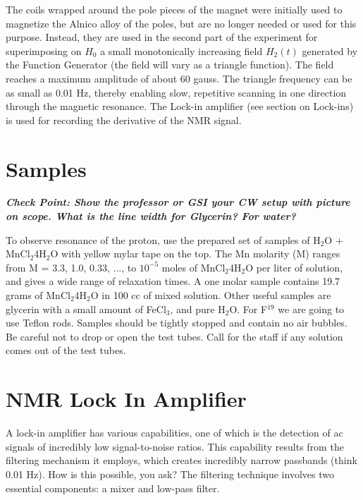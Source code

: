 \documentclass{../lab}
\begin{document}
The coils wrapped around the pole pieces of the magnet were initially used to magnetize the Alnico alloy of the poles, but are no longer needed or used for this purpose. Instead, they are used in the second part of the experiment for superimposing on $H_0$ a small monotonically increasing field $H_2(t)$ generated by the Function Generator (the field will vary as a triangle function). The field reaches a maximum amplitude of about 60 gauss. The triangle frequency can be as small as 0.01 Hz, thereby enabling slow, repetitive scanning in one direction through the magnetic resonance. The Lock-in amplifier (see section on Lock-ins) is used for recording the derivative of the NMR signal.

\section{Samples}

\emph{\textbf{Check Point: Show the professor or GSI your CW setup with picture on scope. What is the line width for Glycerin? For water?}}

To observe resonance of the proton, use the prepared set of samples of H$_2$O + MnCl$_2$4H$_2$O with yellow mylar tape on the top. The Mn molarity (M) ranges from M = 3.3, 1.0, 0.33, ..., to $10^{-5}$ moles of MnCl$_2$4H$_2$O per liter of solution, and gives a wide range of relaxation times. A one molar sample contains 19.7 grams of MnCl$_2$4H$_2$O in 100 cc of mixed solution. Other useful samples are glycerin with a small amount of FeCl$_3$, and pure H$_2$O. For F$^{19}$ we are going to use Teflon rods. Samples should be tightly stopped and contain no air bubbles. Be careful not to drop or open the test tubes. Call for the staff if any solution comes out of the test tubes.

\section{NMR Lock In Amplifier}

A lock-in amplifier has various capabilities, one of which is the detection of ac signals of incredibly low signal-to-noise ratios. This capability results from the filtering mechanism it employs, which creates incredibly narrow passbands (think 0.01 Hz). How is this possible, you ask? The filtering technique involves two essential components: a mixer and low-pass filter.
\end{document}
